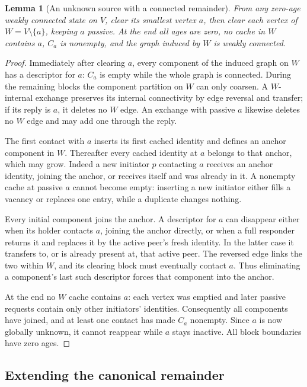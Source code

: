 \documentclass[11pt]{article}
\newtheorem{lemma}[theorem]{Lemma}
\begin{document}
\begin{lemma}[An unknown source with a connected remainder]
\label{lem:source}
From any zero-age weakly connected state on $V$, clear its
smallest vertex $a$, then clear each vertex of
$W=V\setminus\{a\}$, keeping $a$ passive. At the end all ages
are zero, no cache in $W$ contains $a$, $C_a$ is nonempty, and
the graph induced by $W$ is weakly connected.
\end{lemma}
\begin{proof}
Immediately after clearing $a$, every component of the induced
graph on $W$ has a descriptor for $a$: $C_a$ is empty while the
whole graph is connected.
During the remaining blocks the component partition on $W$
can only coarsen. A $W$-internal exchange preserves its internal
connectivity by edge reversal and transfer; if its reply is $a$,
it deletes no $W$ edge. An exchange with passive $a$ likewise
deletes no $W$ edge and may add one through the reply.

The first contact with $a$ inserts its first cached identity and
defines an anchor component in $W$. Thereafter every cached
identity at $a$ belongs to that anchor, which may grow.
Indeed a new initiator $p$ contacting $a$ receives an anchor
identity, joining the anchor, or receives itself and was already
in it. A nonempty cache at passive $a$ cannot become empty:
inserting a new initiator either fills a vacancy or replaces one
entry, while a duplicate changes nothing.

Every initial component joins the anchor. A descriptor for $a$
can disappear either when its holder contacts $a$, joining the
anchor directly, or when a full responder returns it and replaces
it by the active peer's fresh identity. In the latter case it
transfers to, or is already present at, that active peer. The
reversed edge links the two within $W$, and its clearing block
must eventually contact $a$. Thus eliminating a component's
last such descriptor forces that component into the anchor.

At the end no $W$ cache contains $a$: each vertex was emptied
and later passive requests contain only other initiators'
identities. Consequently all components have joined, and at
least one contact has made $C_a$ nonempty. Since $a$ is now
globally unknown, it cannot reappear while $a$ stays inactive.
All block boundaries have zero ages.
\end{proof}

\subsection{Extending the canonical remainder}
\end{document}
